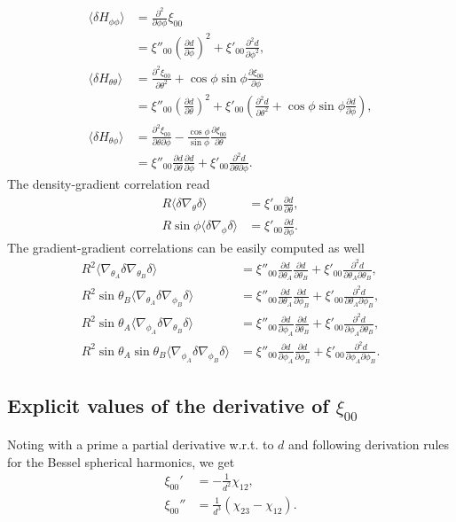 \documentclass[useAMS,usenatbib,babel,superscriptaddress]{mnras}
\newcommand{\mean}[1]{
  \langle #1
  \rangle}
\begin{document}
\begin{align}
  \mean{\delta H_{\phi\phi}}
  &= \frac{\partial^2}{\partial\phi\phi}\xi_{00} \nonumber \\
  &= \xi''_{00}\left(\frac{\partial d}{\partial \phi}\right)^2 + \xi'_{00}\frac{\partial^2 d}{\partial\phi^2},\\
  \mean{\delta H_{\theta\theta}}
  &= \frac{\partial^2 \xi_{00}}{\partial\theta^2}+\cos\phi\sin\phi \frac{\partial \xi_{00}}{\partial\phi} \nonumber\\
  &= \xi''_{00}\left(\frac{\partial d}{\partial \theta}\right)^2 + \xi'_{00}\left(\frac{\partial^2 d}{\partial\theta^2} + \cos\phi\sin\phi\frac{\partial d}{\partial \phi}\right),\\
  \mean{\delta H_{\theta\phi}}
  & = \frac{\partial^2 \xi_{00}}{\partial\theta\partial\phi}-\frac{\cos\phi}{\sin\phi}\frac{\partial \xi_{00}}{\partial\theta} \nonumber \\
  & = \xi''_{00}\frac{\partial d}{\partial\theta}\frac{\partial d}{\partial\phi} + \xi'_{00}\frac{\partial^2 d}{\partial\theta\partial\phi}.
\end{align}
The density-gradient correlation read
\begin{align}
  R\mean{\delta \nabla_\theta \delta} & = \xi'_{00}\frac{\partial d}{\partial\theta},\\
  R\sin\phi\mean{\delta \nabla_\phi \delta} & = \xi'_{00}\frac{\partial d}{\partial\phi}.
\end{align}
The gradient-gradient correlations can be easily computed as well
\begin{align}
  R^2\mean{\nabla_{\theta_A}\delta\nabla_{\theta_B}\delta} &= \xi''_{00}\frac{\partial d}{\partial \theta_A}\frac{\partial d}{\partial \theta_B} + \xi'_{00}\frac{\partial^2d}{\partial\theta_A\partial\theta_B}, \\
  R^2\sin\theta_B\mean{\nabla_{\theta_A}\delta\nabla_{\phi_B}\delta} &= \xi''_{00}\frac{\partial d}{\partial \theta_A}\frac{\partial d}{\partial \phi_B} + \xi'_{00}\frac{\partial^2d}{\partial\theta_A\partial\phi_B}, \\
  R^2\sin\theta_A\mean{\nabla_{\phi_A}\delta\nabla_{\theta_B}\delta} &= \xi''_{00}\frac{\partial d}{\partial \phi_A}\frac{\partial d}{\partial \theta_B} + \xi'_{00}\frac{\partial^2d}{\partial\phi_A\partial\theta_B}, \\
  R^2\sin\theta_A\sin\theta_B\mean{\nabla_{\phi_A}\delta\nabla_{\phi_B}\delta} &= \xi''_{00}\frac{\partial d}{\partial \phi_A}\frac{\partial d}{\partial \phi_B} + \xi'_{00}\frac{\partial^2d}{\partial\phi_A\partial\phi_B}.
\end{align}

\subsection{Explicit values of the derivative of $\xi_{00}$}
Noting with a prime a partial derivative w.r.t. to $d$ and following derivation rules for the Bessel spherical harmonics, we get
\begin{align}
  \xi_{00}' &= -\frac{1}{d^2} \chi_{12}, \\
  \xi_{00}'' &= \frac{1}{d^3}\left(\chi_{23}-\chi_{12}\right).
\end{align}
\end{document}
